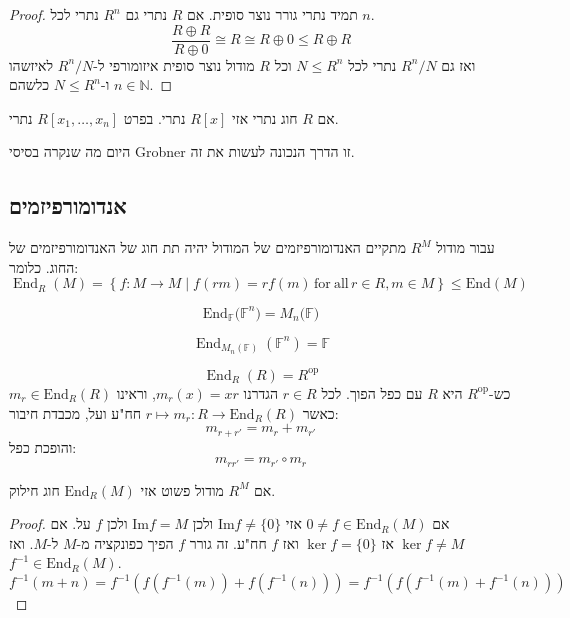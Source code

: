 \documentclass{tstextbook}
\begin{document}
\begin{proof}
תמיד נתרי גורר נוצר סופית. אם \(R\) נתרי גם \(R^{n}\) נתרי לכל \(n\).
$$\frac{R\oplus R}{R\oplus 0}\cong R\cong R\oplus 0 \leq  R\oplus R$$
ואז גם \(R^{n} / N\) נתרי לכל \(N\leq R^{n}\) וכל \(R\) מודול נוצר סופית איזומורפי ל-\(R^{n} / N\) לאיזשהו \(n \in \mathbb{N}\) ו-\(N\leq R^{n}\) כלשהם.

\end{proof}
\begin{proposition}
אם \(R\) חוג נתרי אזי \(R[x]\) נתרי. בפרט \(R[x_{1},\dots,x_{n}]\) נתרי.

\end{proposition}
\begin{remark}
היום מה שנקרה בסיסי Grobner זו הדרך הנכונה לעשות את זה.

\end{remark}
\subsection{אנדומורפיזמים}

\begin{proposition}
עבור מודול \(R^{M}\) מתקיים האנדומורפיזמים של המודול יהיה תת חוג של האנדומורפיזמים של החוג. כלומר:
$$\operatorname{End}_{R}(M)=\left\{f:M\to M\mid f(r m)=r f(m)\,{\mathrm{for~all}}\,r\in R,m\in M\right\}\leq \mathrm{End}(M)$$

\end{proposition}
\begin{example}
$${\mathrm{End}}_{\mathbb{F}}{\bigl(}\mathbb{F}^{n}{\bigr)}=M_{n}{\bigl(}\mathbb{F}{\bigr)}$$

\end{example}
\begin{example}
$$\operatorname{End}_{M_{n}(\mathbb{F})}(\mathbb{F}^{n})=\mathbb{F}$$

\end{example}
\begin{example}
$$\operatorname{End}_{R}(R)=R^{\mathrm{op}}$$
כש-\(R^{\text{op}}\) היא \(R\) עם כפל הפוך. לכל \(r \in R\) הגדרנו \(m_{r}(x)=xr\), וראינו \(m_{r} \in \mathrm{End}_{R}(R)\) כאשר \(r \mapsto m_{r}:R\to \mathrm{End}_{R}(R)\) חח"ע ועל, מכבדת חיבור:
$$m_{r+r'}=m_{r}+m_{r'}$$
והופכת כפל:
$$m_{r r'}= m_{r'}\circ m_{r}$$

\end{example}
\begin{proposition}
אם \(R^{M}\) מודול פשוט אזי \(\mathrm{End}_{R}(M)\) חוג חילוק.

\end{proposition}
\begin{proof}
אם \(0\neq f \in \mathrm{End}_{R}(M)\) אזי \(\mathrm{\mathrm{Im}}f\neq \{ 0 \}\) ולכן \(\mathrm{Im} f = M\) ולכן \(f\) על.
אם \(\ker f \neq M\) אז \(\ker f = \{ 0 \}\) ואז \(f\) חח"ע.
זה גורר \(f\) הפיך כפונקציה מ-\(M\) ל-\(M\). ואז \(f ^{-1} \in \mathrm{End}_{R}(M)\).
$$f^{-1} (m+n)=f^{-1} (f(f^{-1} (m))+f(f^{-1} (n)))=f^{-1} (f(f^{-1} (m)+f^{-1} (n)))$$

\end{proof}
\end{document}
